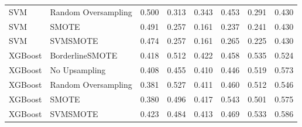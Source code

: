 \begin{tabular}{llllllll}
                         SVM & Random Oversampling & 0.500 &                     0.313 &                 0.343 &                  0.453 &                                   0.291 &     0.430 \\
                         SVM &               SMOTE & 0.491 &                     0.257 &                 0.161 &                  0.237 &                                   0.241 &     0.430 \\
                         SVM &            SVMSMOTE & 0.474 &                     0.257 &                 0.161 &                  0.265 &                                   0.225 &     0.430 \\
                     XGBoost &     BorderlineSMOTE & 0.418 &                     0.512 &                 0.422 &                  0.458 &                                   0.535 &     0.524 \\
                     XGBoost &       No Upsampling & 0.408 &                     0.455 &                 0.410 &                  0.446 &                                   0.519 &     0.573 \\
                     XGBoost & Random Oversampling & 0.381 &                     0.527 &                 0.411 &                  0.460 &                                   0.512 &     0.546 \\
                     XGBoost &               SMOTE & 0.380 &                     0.496 &                 0.417 &                  0.543 &                                   0.501 &     0.575 \\
                     XGBoost &            SVMSMOTE & 0.423 &                     0.484 &                 0.413 &                  0.469 &                                   0.533 &     0.586 \\
\bottomrule
\end{tabular}
